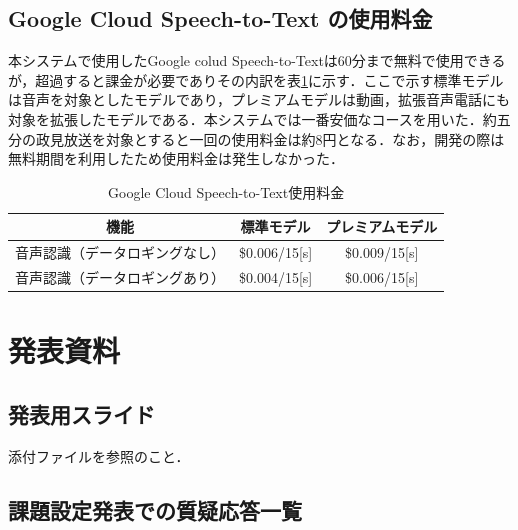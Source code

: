 \documentclass[a4paper,12pt]{jsarticle}
\begin{document}
\subsection{Google Cloud Speech-to-Text の使用料金}

本システムで使用したGoogle colud Speech-to-Textは60分まで無料で使用できるが，超過すると課金が必要でありその内訳を表\ref{tab:GCS2T}に示す\cite{GCS2T}．ここで示す標準モデルは音声を対象としたモデルであり，プレミアムモデルは動画，拡張音声電話にも対象を拡張したモデルである．本システムでは一番安価なコースを用いた．約五分の政見放送を対象とすると一回の使用料金は約8円となる．なお，開発の際は無料期間を利用したため使用料金は発生しなかった．

\begin{table}[H]
	\begin{center}
		\begin{tabular}{c|c|c}
			機能&標準モデル&プレミアムモデル\\ \hline
			音声認識（データロギングなし）&\$0.006/15[s]&\$0.009/15[s]\\
			音声認識（データロギングあり）&\$0.004/15[s]&\$0.006/15[s]
		\end{tabular}
		\caption{Google Cloud Speech-to-Text使用料金}
		\label{tab:GCS2T}
	\end{center}
\end{table}

\section{発表資料}
\subsection{発表用スライド}
添付ファイルを参照のこと．

\subsection{課題設定発表での質疑応答一覧}
\end{document}
